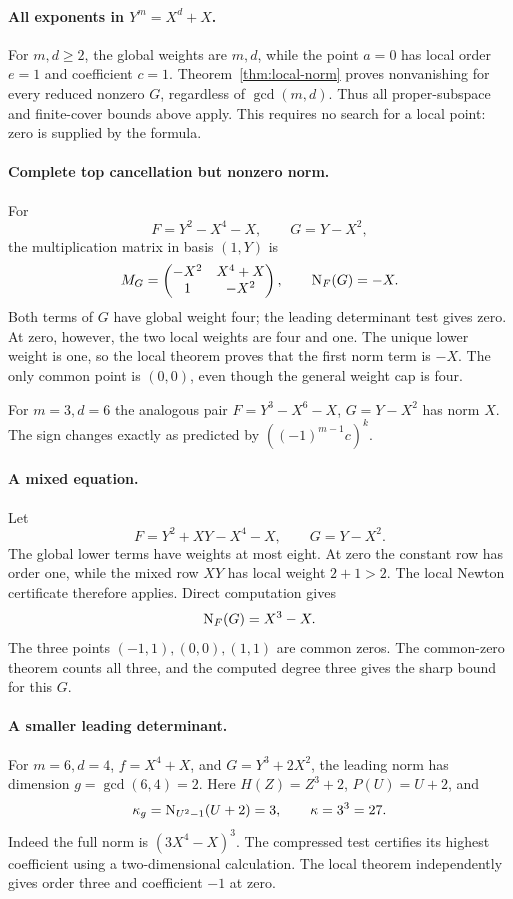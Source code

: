 \paragraph{All exponents in $Y^m=X^d+X$.}
For $m,d\ge2$, the global weights are $m,d$, while the point $a=0$ has local order $e=1$ and coefficient $c=1$. Theorem~\ref{thm:local-norm} proves nonvanishing for every reduced nonzero $G$, regardless of $\gcd(m,d)$. Thus all proper-subspace and finite-cover bounds above apply. This requires no search for a local point: zero is supplied by the formula.

\paragraph{Complete top cancellation but nonzero norm.}
For
\[
 F=Y^2-X^4-X,\qquad G=Y-X^2,
\]
the multiplication matrix in basis $(1,Y)$ is
\[
 M_G=\begin{pmatrix}-X^2&X^4+X\\1&-X^2\end{pmatrix},
 \qquad \operatorname{N}_F(G)=-X.
\]
Both terms of $G$ have global weight four; the leading determinant test gives zero. At zero, however, the two local weights are four and one. The unique lower weight is one, so the local theorem proves that the first norm term is $-X$. The only common point is $(0,0)$, even though the general weight cap is four.

For $m=3,d=6$ the analogous pair $F=Y^3-X^6-X$, $G=Y-X^2$ has norm $X$. The sign changes exactly as predicted by $((-1)^{m-1}c)^k$.

\paragraph{A mixed equation.}
Let
\[
 F=Y^2+XY-X^4-X,\qquad G=Y-X^2.
\]
The global lower terms have weights at most eight. At zero the constant row has order one, while the mixed row $XY$ has local weight $2+1>2$. The local Newton certificate therefore applies. Direct computation gives
\[
 \operatorname{N}_F(G)=X^3-X.
\]
The three points $(-1,1),(0,0),(1,1)$ are common zeros. The common-zero theorem counts all three, and the computed degree three gives the sharp bound for this $G$.

\paragraph{A smaller leading determinant.}
For $m=6,d=4$, $f=X^4+X$, and $G=Y^3+2X^2$, the leading norm has dimension $g=\gcd(6,4)=2$. Here $H(Z)=Z^3+2$, $P(U)=U+2$, and
\[
 \kappa_g=\operatorname{N}_{U^2-1}(U+2)=3,\qquad\kappa=3^3=27.
\]
Indeed the full norm is $(3X^4-X)^3$. The compressed test certifies its highest coefficient using a two-dimensional calculation. The local theorem independently gives order three and coefficient $-1$ at zero.


